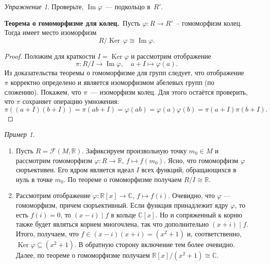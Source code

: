 \documentclass[a4paper,10pt]{amsart}
\newcommand{\Ker}{\mathop{\mathrm{Ker}}}
\renewcommand{\Im}{\mathop{\mathrm{Im}}}
\def\CC{{\mathbb C}}%
\def\RR{{\mathbb R}}%
\def\FFF{\mathcal{F}}
\theoremstyle{definition}
\theoremstyle{remark}
\newtheorem{exercise}{Упражнение}
\newtheorem{example}{Пример}
\begin{document}
\begin{exercise}
Проверьте, $\Im \varphi$~--- подкольцо в~$R'$.
\end{exercise}

\smallskip

{\bf Теорема о гомоморфизме для колец.}\ Пусть $\varphi\colon R\to
R'$~-- гомоморфизм колец. Тогда имеет место изоморфизм
$$
R/\Ker\,\varphi\cong\Im\varphi.
$$

\smallskip

\begin{proof}
Положим для краткости $I = \Ker \varphi$ и рассмотрим отображение
$$
\pi \colon R/I \to \Im \varphi, \quad a+I \mapsto \varphi(a).
$$
Из доказательства теоремы о гомоморфизме для групп следует, что
отображение $\pi$ корректно определено и является изоморфизмом
абелевых групп (по сложению). Покажем, что $\pi$~--- изоморфизм
колец. Для этого остаётся проверить, что $\pi$ сохраняет операцию
умножения:
$$
\pi((a+I)(b+I)) = \pi(ab+I) = \varphi(ab) = \varphi(a) \varphi(b) =
\pi(a+I) \pi(b+I).
$$
\end{proof}

\begin{example}\ 
\begin{enumerate}
\item Пусть $R = \FFF(M, \RR)$. Зафиксируем произвольную точку $m_0 \in M$
и рассмотрим гомоморфизм $\varphi \colon R \to \RR$, $f \mapsto
f(m_0)$. Ясно, что гомоморфизм $\varphi$ сюръективен. Его ядром
является идеал $I$ всех функций, обращающихся в нуль в точке $m_0$.
По теореме о гомоморфизме получаем $R / I \cong \RR$.
\item Рассмотрим отображение $\varphi \colon \RR[x] \to \CC$, $f \mapsto f(i)$. Очевидно, что $\varphi$ --- гомоморфизм, причем сюръективный. Если функция принадлежит ядру $\varphi$, то есть $f(i) = 0$, то $(x - i) \mid f$ в кольце $\CC[x]$. Но и сопряженный к корню также будет являться корнем многочлена, так что дополнительно $(x + i) \mid f$. Итого, получаем, что $f \in (x - i)(x + i) = (x^2 + 1)$ и, соответственно, $\Ker \varphi  \subseteq (x^2 + 1)$. В обратную сторону включение тем более очевидно. Далее, по теореме о гомоморфизме получаем $\RR[x] / (x^2 + 1) \cong \CC$.
\end{enumerate}
\end{example}
\end{document}
